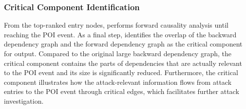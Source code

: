 \subsubsection{Critical Component Identification}
\label{subsubsec:forward-causality}
From the top-ranked entry nodes, \tool performs forward causality analysis until reaching the POI event. 
%
As a final step, \tool identifies the overlap of the backward dependency graph and the forward dependency graph as the critical component for output.
%
Compared to the original large backward dependency graph, the critical component contains the parts of dependencies that are actually relevant to the POI event and its size is significantly reduced.
%
Furthermore, the critical component illustrates how the attack-relevant information flows from attack entries to the POI event through critical edges, which facilitates further attack investigation.

